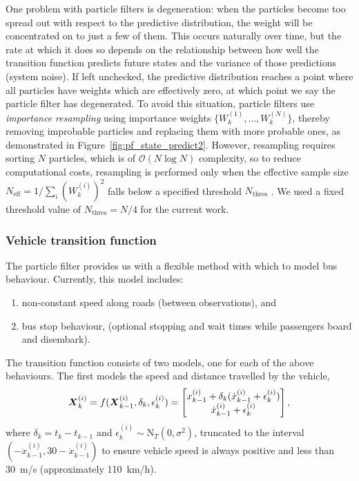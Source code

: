 \documentclass[times, doublespace]{anzsauth}
\begin{document}
One problem with particle filters is degeneration:
when the particles become too spread out with respect to the predictive distribution,
the weight will be concentrated on to just a few of them.
This occurs naturally over time, but the rate at which it does so depends
on the relationship between how well the transition function predicts future states
and the variance of those predictions (system noise).
If left unchecked, the predictive distribution reaches a point
where all particles have weights which are effectively zero,
at which point we say the particle filter has degenerated.
To avoid this situation,
particle filters use \emph{importance resampling}
using importance weights $\{W_k^{(1)}, \ldots, W_k^{(N)}\}$,
thereby removing improbable particles and replacing them with more probable ones,
as demonstrated in Figure~\ref{fig:pf_state_predict2}.
However, resampling requires sorting $N$ particles,
which is of $\mathcal{O}(N\log N)$ complexity,
so to reduce computational costs, resampling is performed only when
the effective sample size $N_{\text{eff}} = 1 / \sum_i (W_k^{(i)})^2$
falls below a specified threshold $N_{\text{thres}}$
\citep{Gustafsson_2002}.
We used a fixed threshold value of $N_{\text{thres}} = N/4$
for the current work.


\subsubsection{Vehicle transition function}
\label{sec:pf_prediction}

The particle filter provides us with a flexible method
with which to model bus behaviour.
Currently, this model includes:
\begin{enumerate}
\item non-constant speed along roads (between observations), and
\item bus stop behaviour, (optional stopping and wait times while passengers board and disembark).
\end{enumerate}
The transition function consists of two models,
one for each of the above behaviours.
The first models the speed and distance travelled by the vehicle,
\begin{equation}
\label{eq:trans_newton}
\mbox{$\boldsymbol{X}$}_k^{(i)} = f(\mbox{$\boldsymbol{X}$}_{k-1}^{(i)}, \delta_k, \epsilon_k^{(i)}) =
    \begin{bmatrix}
        x_{k-1}^{(i)} + \delta_k(\dot x_{k-1}^{(i)} + \epsilon_k^{(i)}) \\
        \dot x_{k-1}^{(i)} + \epsilon_k^{(i)}
    \end{bmatrix},
\end{equation}
where $\delta_k = t_k - t_{k-1}$
and $\epsilon_k^{(i)}\sim\mathrm{N}_T(0, \sigma^2)$, truncated to the interval
$(-\dot x_{k-1}^{(i)}, 30 - \dot x_{k-1}^{(i)})$
to ensure vehicle speed is always positive and less than 30~m/s
(approximately 110~km/h).
\end{document}

